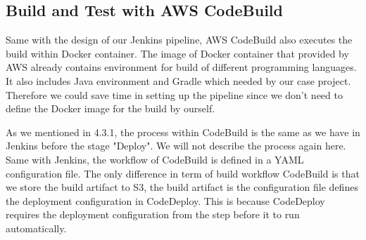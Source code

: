 \subsection{Build and Test with AWS CodeBuild}
Same with the design of our Jenkins pipeline, AWS CodeBuild also executes the build within Docker container. The image of Docker container that provided by AWS already contains environment for build of different programming languages. It also includes Java environment and Gradle which needed by our case project. Therefore we could save time in setting up the pipeline since we don't need to define the Docker image for the build by ourself.
\par
As we mentioned in 4.3.1, the process within CodeBuild is the same as we have in Jenkins before the stage "Deploy". We will not describe the process again here. Same with Jenkins, the workflow of CodeBuild is defined in a YAML configuration file. The only difference in term of build workflow CodeBuild is that we store the build artifact to S3, the build artifact is the configuration file defines the deployment configuration in CodeDeploy. This is because CodeDeploy requires the deployment configuration from the step before it to run automatically.
